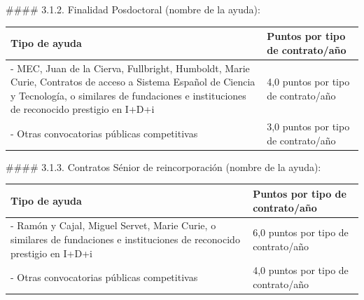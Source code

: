 \documentclass{article}
\begin{document}
\begin{itemize}
\begin{itemize}
\begin{scriptsize}
                  \#\#\#\# 3.1.2. Finalidad Posdoctoral (nombre de la ayuda):
                  \vspace{0.4cm}
                  \begin{table}[h!]\centering\renewcommand{\arraystretch}{1.3}
                    \begin{tabular}{|p{}|p{}|}\hline
                      Tipo de ayuda                                                                                                                                                                                           & Puntos por tipo de contrato/año     \\\hline
                      - MEC, Juan de la Cierva, Fullbright, Humboldt, Marie Curie, Contratos de acceso a Sistema Español de Ciencia y Tecnología, o similares de fundaciones e instituciones de reconocido prestigio en I+D+i & 4,0 puntos por tipo de contrato/año \\\hline
                      - Otras convocatorias públicas competitivas                                                                                                                                                             & 3,0 puntos por tipo de contrato/año \\\hline
                    \end{tabular}\end{table}
                  \vspace{0.4cm}

                  \#\#\#\# 3.1.3. Contratos Sénior de reincorporación (nombre de la ayuda):
                  \vspace{0.4cm}
                  \begin{table}[h!]\centering\renewcommand{\arraystretch}{1.3}
                    \begin{tabular}{|p{}|p{}|}\hline
                      Tipo de ayuda                                                                                                            & Puntos por tipo de contrato/año     \\\hline
                      - Ramón y Cajal, Miguel Servet, Marie Curie, o similares de fundaciones e instituciones de reconocido prestigio en I+D+i & 6,0 puntos por tipo de contrato/año \\\hline
                      - Otras convocatorias públicas competitivas                                                                              & 4,0 puntos por tipo de contrato/año \\\hline
                    \end{tabular}\end{table}
                  \vspace{0.4cm}


\end{scriptsize}
\end{itemize}
\end{itemize}
\end{document}
